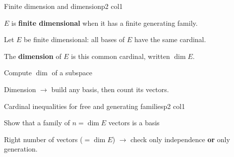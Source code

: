\documentclass[sheet,noautoquant,noautokw]{neyvia-study}
\begin{document}
\begin{concept}[1.36]{Finite dimension and dimension}{p2 col1}
\begin{definition}
\noindent $E$ is \textbf{finite dimensional} when it has a finite generating family.
\par\noindent Let $E$ be finite dimensional: all bases of $E$ have the same cardinal.
\par\noindent The \textbf{dimension} of $E$ is this common cardinal, written $\dim E$.
\end{definition}
\begin{method}{Compute $\dim$ of a subspace}
\end{method}
\begin{reflex}
Dimension \ensuremath{\rightarrow} build any basis, then count its vectors.
\end{reflex}
\end{concept}
\begin{concept}[1.37]{Cardinal inequalities for free and generating families}{p2 col1}
\begin{definition}
\end{definition}
\begin{method}{Show that a family of $n=\dim E$ vectors is a basis}
\step{$\displaystyle \cdots$}
\end{method}
\begin{reflex}
Right number of vectors ($=\dim E$) \ensuremath{\rightarrow} check only independence \textbf{or} only generation.
\end{reflex}
\end{concept}
\end{document}
